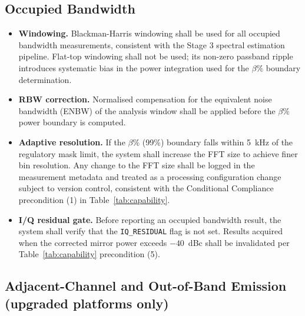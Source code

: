 \documentclass[11pt]{article}
\begin{document}
\subsection*{Occupied Bandwidth}

\begin{itemize}
    \item \textbf{Windowing.} Blackman-Harris windowing shall be used for all occupied bandwidth measurements, consistent with the Stage 3 spectral estimation pipeline. Flat-top windowing shall not be used; its non-zero passband ripple introduces systematic bias in the power integration used for the $\beta\%$ boundary determination.
    \item \textbf{RBW correction.} Normalised compensation for the equivalent noise bandwidth (ENBW) of the analysis window shall be applied before the $\beta\%$ power boundary is computed.
    \item \textbf{Adaptive resolution.} If the $\beta\%$ (99\%) boundary falls within 5~kHz of the regulatory mask limit, the system shall increase the FFT size to achieve finer bin resolution. Any change to the FFT size shall be logged in the measurement metadata and treated as a processing configuration change subject to version control, consistent with the Conditional Compliance precondition (1) in Table~\ref{tab:capability}.
    \item \textbf{I/Q residual gate.} Before reporting an occupied bandwidth result, the system shall verify that the \texttt{IQ\_RESIDUAL} flag is not set. Results acquired when the corrected mirror power exceeds $-40$~dBc shall be invalidated per Table~\ref{tab:capability} precondition (5).
\end{itemize}

\subsection*{Adjacent-Channel and Out-of-Band Emission (upgraded platforms only)}
\end{document}
